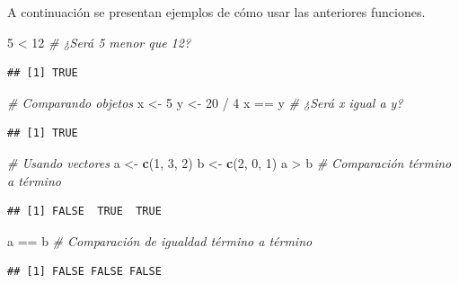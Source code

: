 \documentclass[10pt,]{krantz}
\makeatletter
\newenvironment{Shaded}{\begin{snugshade}}{\end{snugshade}}
\newcommand{\KeywordTok}[1]{\textcolor[rgb]{0.13,0.29,0.53}{\textbf{{#1}}}}
\newcommand{\DecValTok}[1]{\textcolor[rgb]{0.00,0.00,0.81}{{#1}}}
\newcommand{\StringTok}[1]{\textcolor[rgb]{0.31,0.60,0.02}{{#1}}}
\newcommand{\CommentTok}[1]{\textcolor[rgb]{0.56,0.35,0.01}{\textit{{#1}}}}
\newcommand{\NormalTok}[1]{{#1}}
\newenvironment{kframe}{%
\medskip{}
\setlength{\fboxsep}{.8em}
 \def\at@end@of@kframe{}%
 \ifinner\ifhmode%
  \def\at@end@of@kframe{\end{minipage}}%
  \begin{minipage}{\columnwidth}%
 \fi\fi%
 \def\FrameCommand##1{\hskip\@totalleftmargin \hskip-\fboxsep
 \colorbox{shadecolor}{##1}\hskip-\fboxsep
     \hskip-\linewidth \hskip-\@totalleftmargin \hskip\columnwidth}%
 \MakeFramed {\advance\hsize-\width
   \@totalleftmargin\z@ \linewidth\hsize
   \@setminipage}}%
 {\par\unskip\endMakeFramed%
 \at@end@of@kframe}
\renewenvironment{Shaded}{\begin{kframe}}{\end{kframe}}
\makeatother
\begin{document}
A continuación se presentan ejemplos de cómo usar las anteriores
funciones.

\begin{Shaded}
\begin{Highlighting}[]
\DecValTok{5} \NormalTok{<}\StringTok{ }\DecValTok{12}  \CommentTok{# ¿Será 5 menor que 12?}
\end{Highlighting}
\end{Shaded}

\begin{verbatim}
## [1] TRUE
\end{verbatim}

\begin{Shaded}
\begin{Highlighting}[]
\CommentTok{# Comparando objetos}
\NormalTok{x <-}\StringTok{ }\DecValTok{5}
\NormalTok{y <-}\StringTok{ }\DecValTok{20} \NormalTok{/}\StringTok{ }\DecValTok{4}
\NormalTok{x ==}\StringTok{ }\NormalTok{y  }\CommentTok{# ¿Será x igual a y?}
\end{Highlighting}
\end{Shaded}

\begin{verbatim}
## [1] TRUE
\end{verbatim}

\begin{Shaded}
\begin{Highlighting}[]
\CommentTok{# Usando vectores}
\NormalTok{a <-}\StringTok{ }\KeywordTok{c}\NormalTok{(}\DecValTok{1}\NormalTok{, }\DecValTok{3}\NormalTok{, }\DecValTok{2}\NormalTok{)}
\NormalTok{b <-}\StringTok{ }\KeywordTok{c}\NormalTok{(}\DecValTok{2}\NormalTok{, }\DecValTok{0}\NormalTok{, }\DecValTok{1}\NormalTok{)}
\NormalTok{a >}\StringTok{ }\NormalTok{b  }\CommentTok{# Comparación término a término}
\end{Highlighting}
\end{Shaded}

\begin{verbatim}
## [1] FALSE  TRUE  TRUE
\end{verbatim}

\begin{Shaded}
\begin{Highlighting}[]
\NormalTok{a ==}\StringTok{ }\NormalTok{b  }\CommentTok{# Comparación de igualdad término a término}
\end{Highlighting}
\end{Shaded}

\begin{verbatim}
## [1] FALSE FALSE FALSE
\end{verbatim}
\end{document}
